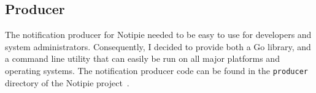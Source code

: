 \subsection{Producer}\label{sec:producer}

The notification producer for Notipie
needed to be easy to use for developers
and system administrators.
Consequently,
I decided to provide both a Go library,
and a command line utility
that can easily be run on all major platforms
and operating systems.
The notification producer code
can be found in the
\texttt{producer} directory of the Notipie project~\cite{sewera_notipie_2022-4}.



